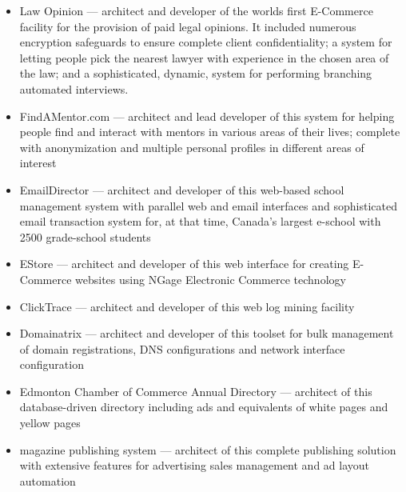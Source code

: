 \begin{resume}
\begin{position}
\begin{itemize}
\item Law Opinion --- architect and developer of the worlds
                        first E-Commerce facility for the provision of 
                        paid legal opinions.  
                        It included numerous encryption safeguards 
                        to ensure complete client confidentiality; a
                        system for letting people pick the nearest
                        lawyer with experience in the chosen area of
                        the law;  and a sophisticated, dynamic,
                        system for performing branching automated interviews.
\item FindAMentor.com --- architect and lead developer of this system
                    for helping people find and interact with mentors in
		    various areas of their lives; complete with anonymization and
		    multiple personal profiles in different areas of interest
\item EmailDirector --- architect and developer of this web-based school management 
                        system with
                        parallel web and email interfaces
                        and sophisticated email transaction system for,
                        at that time, Canada's largest e-school
                        with 2500 grade-school students
\item EStore --- architect and developer of this web interface for creating E-Commerce
                 websites using NGage Electronic Commerce technology
\item ClickTrace --- architect and developer of this web log mining facility
\item Domainatrix --- architect and developer of this 
                      toolset for bulk management of domain registrations, 
                      DNS configurations and network interface
                      configuration
\item Edmonton Chamber of Commerce Annual Directory ---
         architect of this database-driven directory 
         including ads and equivalents of white pages and yellow pages
\item magazine publishing system ---
  architect of this complete publishing solution 
  with extensive features for advertising sales management and ad layout automation

\end{itemize}

\end{position}




\end{resume}
